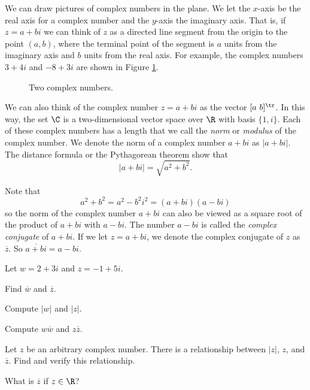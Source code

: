 \label{sec:conj_modulus}
We can draw pictures of complex numbers in the plane. We let the $x$-axis be the real axis for a complex number and the $y$-axis the imaginary axis. That is, if $z=a+bi$ we can think of $z$ as a directed line segment from the origin to the point $(a,b)$, where the terminal point of the segment is $a$ units from the imaginary axis and $b$ units from the real axis. For example, the complex numbers $3+4i$ and $-8+3i$ are shown in Figure \ref{F:complex_numbers}.
 \begin{figure}
\begin{center}
\caption{\scriptsize Two complex numbers.}
\label{F:complex_numbers}
\end{center}
\end{figure}

We can also think of the complex number $z = a+bi$ as the vector $[a \ b]^{\tr}$. In this way, the set $\C$ is a two-dimensional vector space over $\R$ with basis $\{1, i\}$. Each of these complex numbers has a length that we call the \emph{norm} or \emph{modulus} of the complex number. We denote the norm of a complex number $a+bi$ as $|a+bi|$. The distance formula or the Pythagorean theorem show that
\[|a+bi| = \sqrt{a^2+b^2}.\]

Note that
\[a^2+b^2 = a^2-b^2i^2 = (a+bi)(a-bi)\]
so the norm of the complex number $a+bi$ can also be viewed as a square root of the product of $a+bi$ with $a-bi$. The number $a-bi$ is called the \emph{complex conjugate} of $a+bi$. If we let $z = a+bi$, we denote the complex conjugate of $z$ as $\overline{z}$. So $\overline{a+bi} = a-bi$.


\begin{activity} Let $w = 2+3i$ and $z = -1+5i$.
\ba
\item Find $\overline{w}$ and $\overline{z}$.

\item Compute $|w|$ and $|z|$.

\item Compute $w\overline{w}$ and $z \overline{z}$.


\item Let $z$ be an arbitrary complex number. There is a relationship between $|z|$, $z$, and $\overline{z}$. Find and verify this relationship.

\item What is $\overline{z}$ if $z \in \R$?

\ea

\end{activity}


